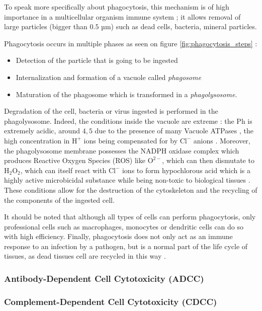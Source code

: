 To speak more specifically about phagocytosis, this mechanism is of high importance
in a multicellular organism immune system ; it allows removal of large particles
(bigger than $0.5$ µm) such as dead cells, bacteria, mineral particles.

Phagocytosis occurs in multiple phases \cite{uribe-querol_phagocytosis_2020}
as seen on figure \ref{fig:phagocytosis_steps} : 
\begin{itemize}
    \item Detection of the particle that is going to be ingested
    \item Internalization and formation of a vacuole called \emph{phagosome}
    \item Maturation of the phagosome which is transformed in a \emph{phagolysosome}.
\end{itemize}

Degradation of the cell, bacteria or virus ingested is performed in the phagolysosome.
Indeed, the conditions inside the vacuole are extreme : the Ph is extremely acidic,
around $4,5$ due to the presence of many Vacuole ATPases \cite{uribe-querol_phagocytosis_2020},
the high concentration in $\text{H}^+$ ions being compensated for
by $\text{Cl}^-$ anions \cite{gordon_phagocytosis_2016}. 
Moreover, the phagolysosome membrane possesses the NADPH oxidase complex 
which produces Reactive Oxygen Species (ROS) like $\text{O}^{2-}$, which can then
dismutate to $\text{H}_2\text{O}_2$, which can itself react with $\text{Cl}^-$ ions
to form hypochlorous acid which is a highly active microbicidal substance while
being non-toxic to biological tissues \cite{eryilmaz_antimicrobial_2013}.
These conditions allow for the destruction of the cytoskeleton and the 
recycling of the components of the ingested cell.


It should be noted that although all types of cells can perform phagocytosis,
only professional cells such as macrophages, monocytes or dendritic cells can
do so with high efficiency. Finally, phagocytosis does not only act as an
immune response to an infection by a pathogen, but is a normal part of the
life cycle of tissues, as dead tissues cell are recycled 
in this way \cite{arandjelovic_phagocytosis_2015}.

\subsubsection{Antibody-Dependent Cell Cytotoxicity (ADCC)}

\subsubsection{Complement-Dependent Cell Cytotoxicity (CDCC)}
